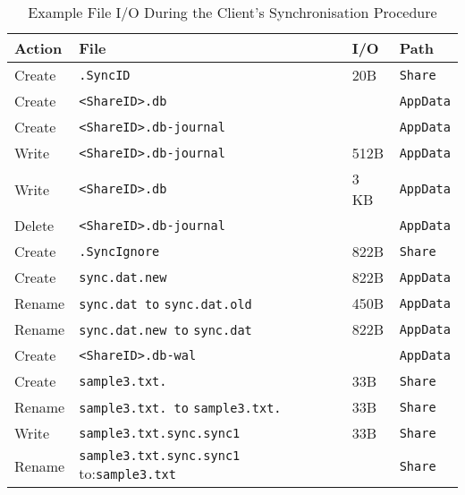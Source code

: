 \documentclass[final,5p,times,twocolumn]{elsarticle}
\begin{document}
\begin{table}[t]
\begin{tabular}{|l|p{1.5in}|l|l|}
\hline
\textbf{Action} & \textbf{File}  & \textbf{I/O}  &  \textbf{Path}  \\ \hline
Create & \texttt{\small .SyncID}  & 20B  & \texttt{Share} \\ \hline
Create & \texttt{\small <ShareID>.db}  & \- & \texttt{AppData} \\ \hline
Create & \texttt{\small <ShareID>.db-journal} & \- & \texttt{AppData} \\ \hline
Write &   \texttt{\small <ShareID>.db-journal} & 512B & \texttt{AppData} \\ \hline
Write &  \texttt{\small <ShareID>.db} & 3 KB & \texttt{AppData} \\ \hline
Delete & \texttt{\small <ShareID>.db-journal} & \- & \texttt{AppData} \\ \hline
Create & \texttt{\small .SyncIgnore} & 822B & \texttt{Share} \\ \hline
Create & \texttt{\small sync.dat.new} & 822B & \texttt{AppData} \\ \hline
Rename & \texttt{\small sync.dat to} \texttt{sync.dat.old} & 450B & \texttt{AppData} \\ \hline
Rename & \texttt{\small sync.dat.new to} \texttt{sync.dat} & 822B & \texttt{AppData} \\ \hline
Create & \texttt{\small <ShareID>.db-wal} & \- & \texttt{AppData} \\ \hline
Create & \texttt{\small sample3.txt.} & 33B & \texttt{Share} \\ \hline
Rename & \texttt{\small sample3.txt. to} \texttt{sample3.txt.} & 33B & \texttt{Share} \\ \hline
Write & \texttt{\small sample3.txt.\!sync.\!sync1} & 33B & \texttt{Share} \\ \hline
Rename & \texttt{\small sample3.txt.\!sync.\!sync1} to:\texttt{sample3.txt} & \- & \texttt{Share} \\ \hline
\end{tabular}
\caption{Example File I/O During the Client's Synchronisation Procedure}
\label{tab:synchro}
\end{table}
\end{document}

